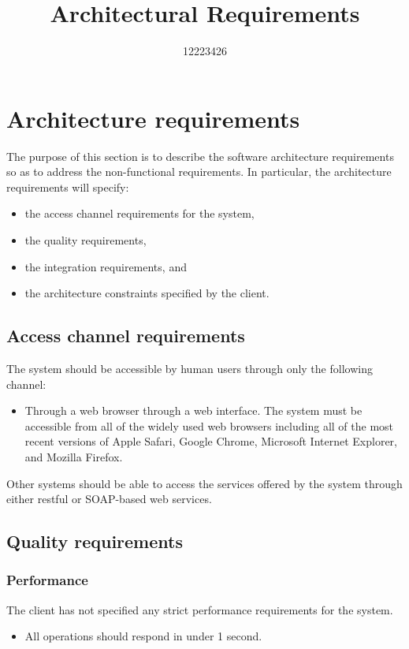 \documentclass[11pt,a4paper]{article}
\begin{document}
\begin{titlepage}
\title{Architectural Requirements}
\author{12223426}
\maketitle
\end{titlepage}


\section{Architecture requirements}
The purpose of this section is to describe the software architecture requirements so as to address the non-functional requirements. In particular, the architecture requirements will specify:
\begin{itemize}
	\item the access channel requirements for the system,
	\item the quality requirements,
	\item the integration requirements, and
	\item the architecture constraints specified by the client.
\end{itemize}

\subsection{Access channel requirements}
The system should be accessible by human users through only the following channel:
\begin{itemize}
	\item Through a web browser through a web interface. The system must be accessible from all of the widely used web browsers including all of the most recent versions of Apple Safari, Google Chrome, Microsoft Internet Explorer, and Mozilla Firefox.
\end{itemize}

Other systems should be able to access the services offered by the system through either restful or SOAP-based web services.

\subsection{Quality requirements}
	\subsubsection{Performance}
	The client has not specified any strict performance requirements for the system.
	\begin{itemize}
		\item All operations should respond in under 1 second.
	\end{itemize}
	
\end{document}
